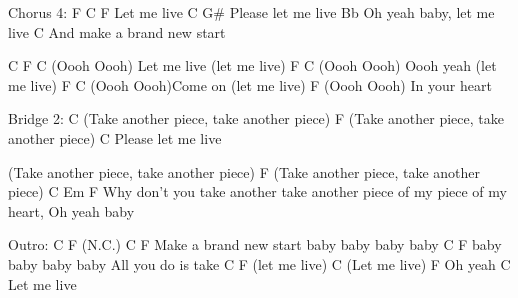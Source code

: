 \begin{multicols}{2}
\begin{lstsong}
Chorus 4:
F                C F
     Let me live
   C         G#
Please let me live 
                 Bb
Oh yeah baby, let me live 
                       C
And make a brand new start 

C       F                         C
(Oooh Oooh)   Let me live (let me live) 
        F                      C
(Oooh Oooh) Oooh yeah (let me live) 
         F                   C
(Oooh Oooh)Come on (let me live)
         F          
(Oooh Oooh) In your heart 
\end{lstsong}
\columnbreak
\begin{lstsong}
Bridge 2:
        C
(Take another piece, take another piece) 
        F
(Take another piece, take another piece)
C
Please let me live 

(Take another piece, take another piece) 
        F
(Take another piece, take another piece)
             C                         Em F
Why don't you take another take another piece of my piece of my heart, 
Oh yeah baby 

Outro:
C  F  (N.C.)
                 C                    F
Make a brand new start baby baby baby baby 
                C                 F
baby baby baby baby All you do is take 
         C              F
(let me live) 
         C
(Let me live) 
          F
Oh yeah 
        C
Let me live
\end{lstsong}
\end{multicols}
\newpage


